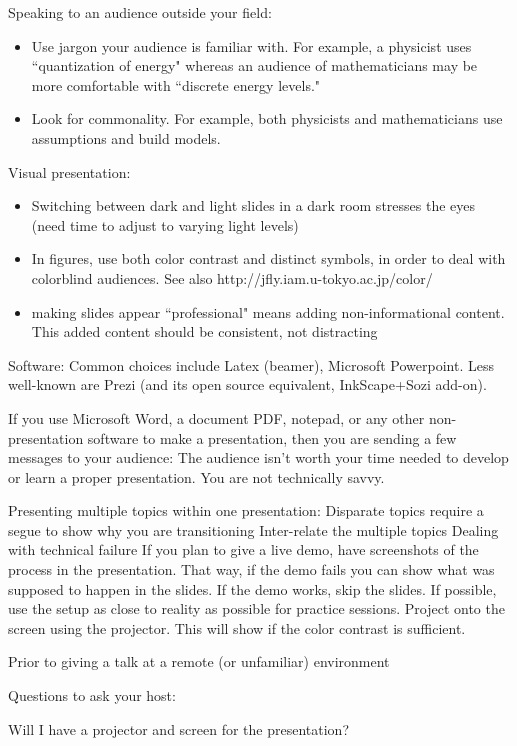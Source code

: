 Speaking to an audience outside your field:
\begin{itemize}
    \item Use jargon your audience is familiar with. For example, a physicist uses ``quantization of energy" whereas an audience of mathematicians may be more comfortable with ``discrete energy levels."
    \item Look for commonality. For example, both physicists and mathematicians use assumptions and build models.
\end{itemize}
Visual presentation:
\begin{itemize}
    \item Switching between dark and light slides in a dark room stresses the eyes (need time to adjust to varying light levels)
    \item In figures, use both color contrast and distinct symbols, in order to deal with colorblind audiences. See also http://jfly.iam.u-tokyo.ac.jp/color/
    \item making slides appear ``professional" means adding non-informational content. This added content should be consistent, not distracting
\end{itemize}
Software:
Common choices include Latex (beamer), Microsoft Powerpoint. Less well-known are Prezi (and its open source equivalent, InkScape+Sozi add-on).

If you use Microsoft Word, a document PDF, notepad, or any other non-presentation software to make a presentation, then you are sending a few messages to your audience:
The audience isn't worth your time needed to develop or learn a proper presentation. 
You are not technically savvy.

Presenting multiple topics within one presentation:
Disparate topics require a segue to show why you are transitioning
Inter-relate the multiple topics 
Dealing with technical failure
If you plan to give a live demo, have screenshots of the process in the presentation. That way, if the demo fails you can show what was supposed to happen in the slides. If the demo works, skip the slides.
If possible, use the setup as close to reality as possible for practice sessions. Project onto the screen using the projector. This will show if the color contrast is sufficient.

Prior to giving a talk at a remote (or unfamiliar) environment

Questions to ask your host:

Will I have a projector and screen for the presentation?

